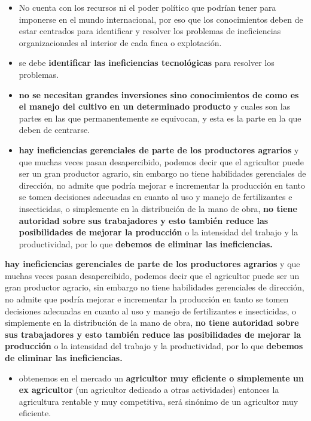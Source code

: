 \documentclass[
  letterpaper,
  DIV=11,
  numbers=noendperiod]{scrartcl}
\providecommand{\tightlist}{%
  \setlength{\itemsep}{0pt}\setlength{\parskip}{0pt}}\usepackage{longtable,booktabs,array}
\begin{document}
\begin{itemize}
\item
  No cuenta con los recursos ni el poder político que podrían tener para
  imponerse en el mundo internacional, por eso que los conocimientos
  deben de estar centrados para identificar y resolver los problemas de
  ineficiencias organizacionales al interior de cada finca o
  explotación.
\item
  se debe \textbf{identificar las ineficiencias tecnológicas} para
  resolver los problemas.
\item
  \textbf{no se necesitan grandes inversiones sino conocimientos de como
  es el manejo del cultivo en un determinado producto} y cuales son las
  partes en las que permanentemente se equivocan, y esta es la parte en
  la que deben de centrarse.
\item
  \textbf{hay ineficiencias gerenciales de parte de los productores
  agrarios} y que muchas veces pasan desapercibido, podemos decir que el
  agricultor puede ser un gran productor agrario, sin embargo no tiene
  habilidades gerenciales de dirección, no admite que podría mejorar e
  incrementar la producción en tanto se tomen decisiones adecuadas en
  cuanto al uso y manejo de fertilizantes e insecticidas, o simplemente
  en la distribución de la mano de obra, \textbf{no tiene autoridad
  sobre sus trabajadores y esto también reduce las posibilidades de
  mejorar la producción} o la intensidad del trabajo y la productividad,
  por lo que \textbf{debemos de eliminar las ineficiencias.}
\end{itemize}

\textbf{hay ineficiencias gerenciales de parte de los productores
agrarios} y que muchas veces pasan desapercibido, podemos decir que el
agricultor puede ser un gran productor agrario, sin embargo no tiene
habilidades gerenciales de dirección, no admite que podría mejorar e
incrementar la producción en tanto se tomen decisiones adecuadas en
cuanto al uso y manejo de fertilizantes e insecticidas, o simplemente en
la distribución de la mano de obra, \textbf{no tiene autoridad sobre sus
trabajadores y esto también reduce las posibilidades de mejorar la
producción} o la intensidad del trabajo y la productividad, por lo que
\textbf{debemos de eliminar las ineficiencias.}

\begin{itemize}
\tightlist
\item
  obtenemos en el mercado un \textbf{agricultor muy eficiente o
  simplemente un ex agricultor} (un agricultor dedicado a otras
  actividades) entonces la agricultura rentable y muy competitiva, será
  sinónimo de un agricultor muy eficiente.
\end{itemize}
\end{document}
